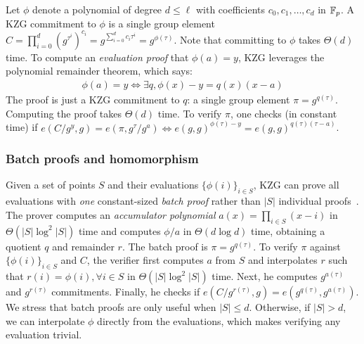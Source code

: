 Let $\phi$ denote a polynomial of degree $d\le \ell$ with coefficients $c_0, c_1, \dots, c_d$ in $\mathbb{F}_p$.
A KZG commitment to $\phi$ is a single group element $C = \prod_{i=0}^d {\left(g^{\tau^i}\right)^{c_i}} = g^{\sum_{i=0}^d c_i \tau^i} = g^{\phi(\tau)}$.
Note that committing to $\phi$ takes $\Theta(d)$ time.
To compute an \textit{evaluation proof} that $\phi(a) = y$, KZG leverages the polynomial remainder theorem, which says:
\begin{align}
    \phi(a) = y \Leftrightarrow \exists q, \phi(x) - y = q(x)(x-a)
    \label{eq:poly-rem-thm}
\end{align}
The proof is just a KZG commitment to $q$: a single group element $\pi=g^{q(\tau)}$.
Computing the proof takes $\Theta(d)$ time.
To verify $\pi$, one checks (in constant time) if 
$e(C / g^y, g) = e(\pi, g^{\tau}/g^a)\Leftrightarrow e(g,g)^{\phi(\tau)-y} = e(g,g)^{q(\tau)(\tau-a)}$.

\subsubsection{Batch proofs and homomorphism}
\label{s:prelim:polycommit:kzg:batch}
\label{s:prelim:polycommit:kzg:homomorphism}
Given a set of points $S$ and their evaluations $\{\phi(i)\}_{i\in S}$, KZG can prove all evaluations with \textit{one} constant-sized \textit{batch proof} rather than $|S|$ individual proofs~\cite{polycommit}.
The prover computes an \textit{accumulator polynomial} $a(x)=\prod_{i\in S} (x-i)$ in $\Theta(|S|\log^2{|S|})$ time and computes $\phi/a$ in $\Theta(d\log{d})$ time, obtaining a quotient $q$ and remainder $r$.
The batch proof is $\pi=g^{q(\tau)}$.
To verify $\pi$ against $\{\phi(i)\}_{i\in S}$ and $C$, the verifier first computes $a$ from $S$ and interpolates $r$ such that $r(i)=\phi(i), \forall i \in S$ in $\Theta(|S|\log^2{|S|})$ time.
Next, he computes $g^{a(\tau)}$ and $g^{r(\tau)}$ commitments.
Finally, he checks if $e(C / g^{r(\tau)}, g) = e(g^{q(\tau)}, g^{a(\tau)})$.
We stress that batch proofs are only useful when $|S| \le d$.
Otherwise, if $|S| > d$, we can interpolate $\phi$ directly from the evaluations, which makes verifying any evaluation trivial.

